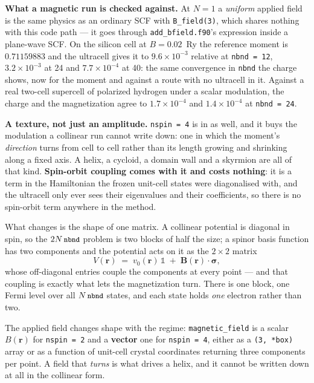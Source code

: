 \documentclass[11pt,a4paper]{article}
\newcommand{\code}[1]{\texttt{\small #1}}
\begin{document}
\textbf{What a magnetic run is checked against.} At $N = 1$ a \emph{uniform}
applied field is the same physics as an ordinary SCF with \code{B\_field(3)},
which shares nothing with this code path --- it goes through
\code{add\_bfield.f90}'s expression inside a plane-wave SCF. On the silicon cell
at $B = 0.02$~Ry the reference moment is $0.71159883$ and the ultracell gives it
to $9.6\times10^{-3}$ relative at \code{nbnd = 12}, $3.2\times10^{-3}$ at 24 and
$7.7\times10^{-4}$ at 40: the same convergence in \code{nbnd} the charge shows,
now for the moment and against a route with no ultracell in it. Against a real
two-cell supercell of polarized hydrogen under a scalar modulation, the charge
and the magnetization agree to $1.7\times10^{-4}$ and $1.4\times10^{-4}$ at
\code{nbnd = 24}.

\textbf{A texture, not just an amplitude.} \code{nspin = 4} is in as well, and it buys
the modulation a collinear run cannot write down: one in which the moment's
\emph{direction} turns from cell to cell rather than its length growing and
shrinking along a fixed axis. A helix, a cycloid, a domain wall and a skyrmion
are all of that kind. \textbf{Spin-orbit coupling comes with it and costs
nothing}: it is a term in the Hamiltonian the frozen unit-cell states were
diagonalised with, and the ultracell only ever sees their eigenvalues and their
coefficients, so there is no spin-orbit term anywhere in the method.

What changes is the shape of one matrix. A collinear potential is diagonal in
spin, so the $2N\,\code{nbnd}$ problem is two blocks of half the size; a spinor
basis function has two components and the potential acts on it as the $2\times2$
matrix
%
\begin{equation}
V(\mathbf r) \;=\; v_0(\mathbf r)\,\mathbb 1 \;+\; \mathbf B(\mathbf r)\cdot\boldsymbol\sigma ,
\end{equation}
%
whose off-diagonal entries couple the components at every point --- and that
coupling is exactly what lets the magnetization turn. There is one block, one
Fermi level over all $N\,\code{nbnd}$ states, and each state holds \emph{one}
electron rather than two.

The applied field changes shape with the regime: \code{magnetic\_field} is a
scalar $B(\mathbf r)$ for \code{nspin = 2} and a \textbf{vector} one for
\code{nspin = 4}, either as a \code{(3, *box)} array or as a function of
unit-cell crystal coordinates returning three components per point. A field that
\emph{turns} is what drives a helix, and it cannot be written down at all in the
collinear form.
\end{document}
